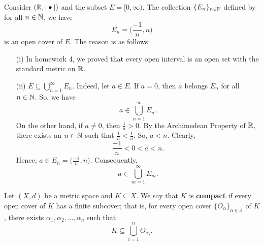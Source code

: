 \documentclass[a4paper]{report}
\begin{document}
\begin{eg}
    Consider \( (\mathbb{R} , | \bullet | ) \) and the subset \( E = [0,\infty ) \). The collection \( \{ {E}_{n} \}_{n \in \mathbb{N} } \) defined by for all \( n \in \mathbb{N}  \), we have 
    \[  {E}_{n} = \Big(  \frac{ -1 }{ n } , n  \Big) \]
    is an open cover of \( E  \). The reason is as follows:
    \begin{enumerate}
        \item[(i)] In homework 4, we proved that every open interval is an open set with the standard metric on \( \mathbb{R}  \).
        \item[(ii)] \( E \subseteq \bigcup_{ n=1  }^{ \infty  }  {E}_{n} \). Indeed, let \( a \in E  \). If \( a = 0  \), then \( a  \) belongs \( {E}_{n} \) for all \( n \in \mathbb{N} \). So, we have 
            \[  a \in \bigcup_{ n=1  }^{ \infty  } {E}_{n}. \]
            On the other hand, if \( a \neq 0  \), then \( \frac{ 1 }{ a }  > 0 \). By the Archimedean Property of \( \mathbb{R}  \), there exists an \( n \in \mathbb{N}  \) such that \( \frac{ 1 }{ n }  < \frac{ 1 }{ a }  \). So, \( a < n  \). Clearly, 
            \[  \frac{ -1 }{ n }  < 0 < a <  n. \]
            Hence, \( a \in {E}_{n} = \Big(  \frac{ -1 }{ n } , n  \Big) \). Consequently, 
            \[  a \in \bigcup_{ m=1  }^{ \infty   } {E}_{m}. \]

    \end{enumerate}
\end{eg}

\begin{definition}[Compactness]
    Let \( (X,d) \) be a metric space and \( K \subseteq X  \). We say that \(  K \) is \textbf{compact} if every open cover of \(  K  \) has a finite subcover; that is, for every open cover \( \{ {O}_{\alpha} \}_{\alpha \in \Lambda}  \) of \( K  \), there exists \( {\alpha}_{1}, {\alpha}_{2}, \dots, {\alpha}_{n} \) such that
    \[  K \subseteq \bigcup_{ i = 1  }^{ n }  {O}_{{\alpha}_{i}}. \]
\end{definition}
\end{document}
